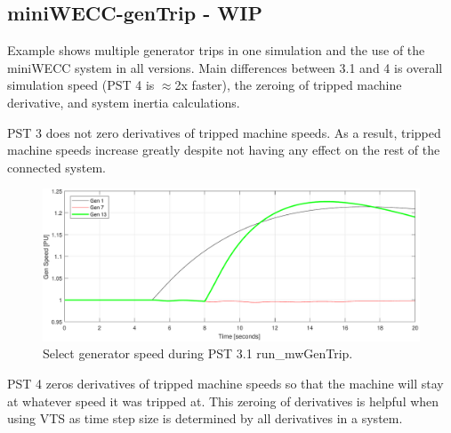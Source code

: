 \subsection{miniWECC-genTrip - WIP} \label{ex: mw gentrips}
Example shows multiple generator trips in one simulation and the use of the miniWECC system in all versions.
Main differences between 3.1 and 4 is overall simulation speed (PST 4 is $\approx$2x faster), the zeroing of tripped machine derivative, and system inertia calculations.\\




\pagebreak

PST 3 does not zero derivatives of tripped machine speeds.
As a result, tripped machine speeds increase greatly despite not having any effect on the rest of the connected system.

\begin{figure}[H]
	\centering
	\footnotesize
	\includegraphics[width=\linewidth]{examples/miniWECC/mwGenTrip-3-Speed}
	\caption{Select generator speed during PST 3.1 run\_mwGenTrip.}
	\label{fig: mwGenTrip 3 speed}
\end{figure}%

PST 4 zeros derivatives of tripped machine speeds so that the machine will stay at whatever speed it was tripped at.
This zeroing of derivatives is helpful when using VTS as time step size is determined by all derivatives in a system.

